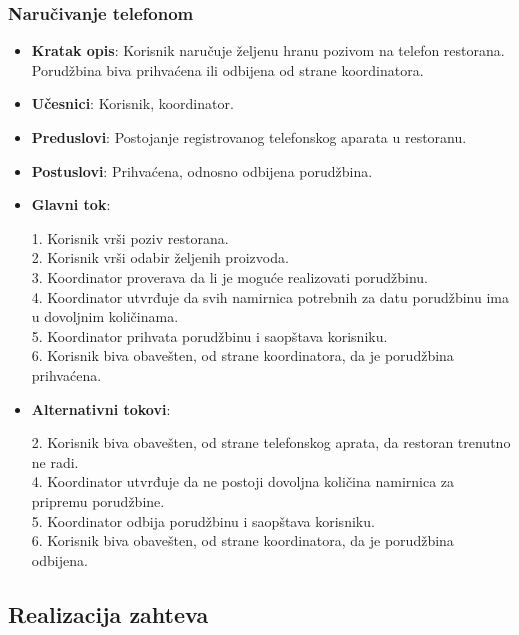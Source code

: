 \subsubsection{Naručivanje telefonom}
\begin{itemize}
    \item \textbf{Kratak opis}: Korisnik naručuje željenu hranu pozivom na telefon restorana. Porudžbina biva prihvaćena ili odbijena od strane koordinatora.
    \item \textbf{Učesnici}: Korisnik, koordinator.
    \item \textbf{Preduslovi}: Postojanje registrovanog telefonskog aparata u restoranu.
    \item \textbf{Postuslovi}: Prihvaćena, odnosno odbijena porudžbina.
     \item \textbf{Glavni tok}:
    
    1. Korisnik vrši poziv restorana.\\
    2. Korisnik vrši odabir željenih proizvoda.\\
    3. Koordinator proverava da li je moguće realizovati porudžbinu.\\
    4. Koordinator utvrđuje da svih namirnica potrebnih za datu porudžbinu ima u dovoljnim količinama.\\
    5. Koordinator prihvata porudžbinu i saopštava korisniku.\\
    6. Korisnik biva obavešten, od strane koordinatora, da je porudžbina prihvaćena.
    
    \item \textbf{Alternativni tokovi}:
     
     2. Korisnik biva obavešten, od strane telefonskog aprata, da restoran trenutno ne radi.\\
     4. Koordinator utvrđuje da ne postoji dovoljna količina namirnica za pripremu porudžbine.\\
     5. Koordinator odbija porudžbinu i saopštava korisniku.\\
     6. Korisnik biva obavešten, od strane koordinatora, da je porudžbina odbijena.
    
     
\end{itemize}


\subsection{Realizacija zahteva}
